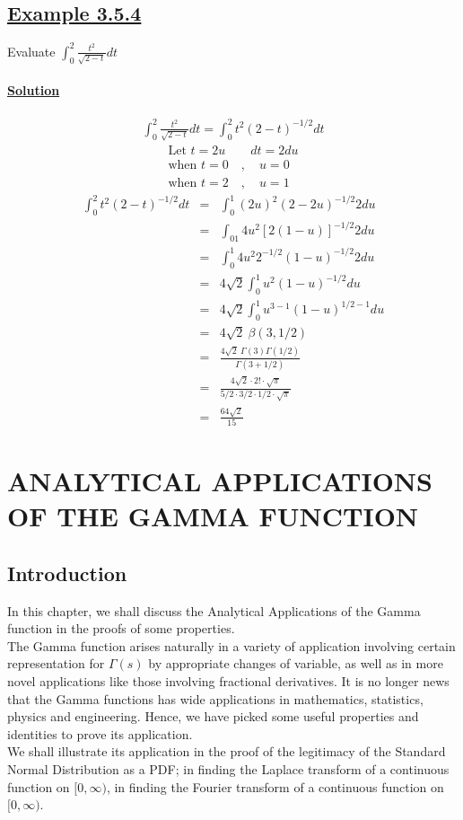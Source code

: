 \documentclass[11pt]{report}
\newcommand{\ubt}[1]{\textbf{\underline{#1}}}
\newcommand{\sps}{\\[0.2cm]}
\newcommand{\dsp}{\displaystyle}
\newcommand{\example}[1]{\section*{\ubt{Example #1}}}
\newcommand{\solution}{\subsubsection{\ubt{Solution}}}
\begin{document}
	
	\example{3.5.4}
	Evaluate $\dsp\int_0^2\frac{t^2}{\sqrt{2-t}}dt$
	
	\solution
	\begin{eqnarray*}
		\int_0^2\frac{t^2}{\sqrt{2-t}}dt = \int_0^2 t^2(2-t)^{-1/2}dt
	\end{eqnarray*}
	\begin{gather*}
		\text{Let } t = 2u \qquad dt = 2du\\
		\text{when } t=0\quad , \quad u =0\\
		\text{when } t= 2\quad , \quad u=1
	\end{gather*}
	\begin{eqnarray*}
		\int_0^2 t^2(2-t)^{-1/2}dt &=& \int_0^1 (2u)^2 (2-2u)^{-1/2}2du\sps
		&=& \int_01 4u^2\left[2(1-u)\right]^{-1/2}2du\sps
		&=& \int_0^1 4u^2 2^{-1/2}(1-u)^{-1/2}2du\sps
		&=& 4\sqrt{2}\int_0^1 u^2(1-u)^{-1/2}du\sps
		&=& 4\sqrt{2}\int_0^1 u^{3-1}(1-u)^{1/2 - 1}du\sps
		&=& 4\sqrt{2}~\beta(3,1/2)\sps
		&=&\frac{4\sqrt{2}~\Gamma(3)\Gamma\left(1/2\right)}{\Gamma(3+1/2)}\sps
		&=&\frac{4\sqrt{2}\cdot 2! \cdot \sqrt{\pi}}{5/2 \cdot 3/2 \cdot 1/2 \cdot \sqrt{\pi}}\sps
		&=& \frac{64\sqrt{2}}{15}
	\end{eqnarray*}
	
	
	\chapter{ANALYTICAL APPLICATIONS OF THE GAMMA FUNCTION}
	\section{Introduction}
	In this chapter, we shall discuss the Analytical Applications of the Gamma function in the proofs of some properties.\\
	
	The Gamma function arises naturally in a variety of application involving certain representation for $\Gamma(s)$ by appropriate changes of variable, as well as in more novel applications like those involving  fractional derivatives. It is no longer news that the Gamma functions has wide applications in mathematics, statistics, physics and engineering. Hence, we have picked some useful properties and identities to prove its application.\\
	
	We shall illustrate its application in the proof of the legitimacy of the Standard Normal Distribution as a PDF; in finding the Laplace transform of a continuous function on $[0,\infty)$, in finding the Fourier transform of a continuous function on $[0,\infty)$.
	
\end{document}
